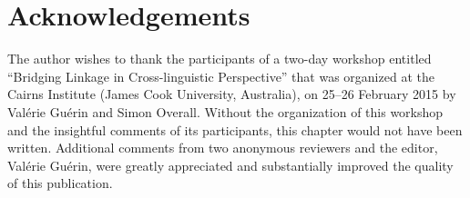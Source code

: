 \documentclass[output=paper]{LSP/langsci}
\begin{document}
\section*{Acknowledgements}
The author wishes to thank the participants of a two-day workshop entitled ``Bridging Linkage in Cross-linguistic Perspective'' that was organized at the Cairns Institute (James Cook University, Australia), on 25--26 February 2015 by Valérie Guérin and Simon Overall. Without the organization of this workshop and the insightful comments of its participants, this chapter would not have been written. Additional comments from two anonymous reviewers and the editor, Valérie Guérin, were greatly appreciated and substantially improved the quality of this publication.

\end{document}
